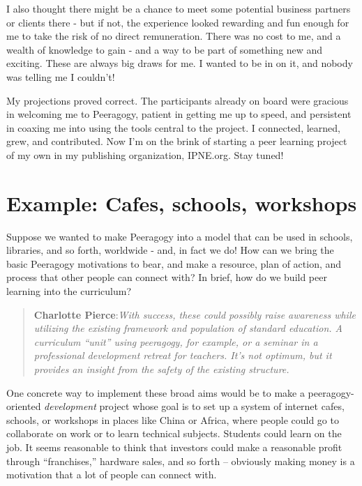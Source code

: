 I also thought there might be a chance to meet some potential business
partners or clients there - but if not, the experience looked rewarding
and fun enough for me to take the risk of no direct remuneration. There
was no cost to me, and a wealth of knowledge to gain - and a way to be
part of something new and exciting. These are always big draws for me. I
wanted to be in on it, and nobody was telling me I couldn't!

My projections proved correct. The participants already on board were
gracious in welcoming me to Peeragogy, patient in getting me up to
speed, and persistent in coaxing me into using the tools central to the
project. I connected, learned, grew, and contributed. Now I'm on the
brink of starting a peer learning project of my own in my publishing
organization, IPNE.org. Stay tuned!

\section*{Example: Cafes, schools, workshops}

Suppose we wanted to make Peeragogy into a model that can be used in
schools, libraries, and so forth, worldwide - and, in fact we do! How
can we bring the basic Peeragogy motivations to bear, and make a
resource, plan of action, and process that other people can connect
with? In brief, how do we build peer learning into the curriculum?

\begin{quote}
\textbf{Charlotte Pierce}:\emph{With success, these could possibly raise
awareness while utilizing the existing framework and population of
standard education. A curriculum ``unit'' using peeragogy, for example,
or a seminar in a professional development retreat for teachers. It's
not optimum, but it provides an insight from the safety of the existing
structure.}

\end{quote}
One concrete way to implement these broad aims would be to make a
peeragogy-oriented \emph{development} project whose goal is to set up a
system of internet cafes, schools, or workshops in places like China or
Africa, where people could go to collaborate on work or to learn
technical subjects. Students could learn on the job. It seems reasonable
to think that investors could make a reasonable profit through
``franchises,'' hardware sales, and so forth -- obviously making money
is a motivation that a lot of people can connect with.

